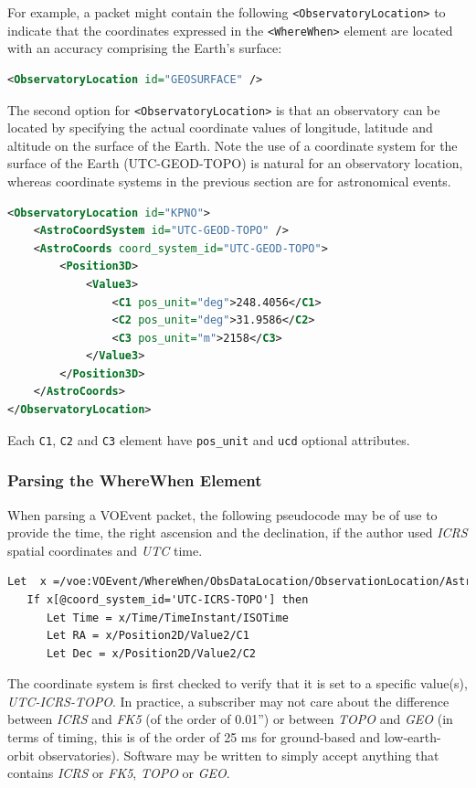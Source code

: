 \documentclass[11pt,a4paper]{ivoa}
\begin{document}
For example, a packet might contain the following {\tt <ObservatoryLocation>} 
to indicate that the coordinates expressed in the {\tt <WhereWhen>} element are 
located with an accuracy comprising the Earth's surface: 
\begin{lstlisting}[language=XML]
<ObservatoryLocation id="GEOSURFACE" /> 
\end{lstlisting}

The second option for {\tt <ObservatoryLocation>} is that an observatory can be 
located by specifying the actual coordinate values of longitude, latitude and 
altitude on the surface of the Earth. Note the use of a coordinate system for 
the surface of the Earth (UTC-GEOD-TOPO) is natural for an observatory location, 
whereas coordinate systems in the previous section are for astronomical events. 
\begin{lstlisting}[language=XML]
<ObservatoryLocation id="KPNO">
    <AstroCoordSystem id="UTC-GEOD-TOPO" />
    <AstroCoords coord_system_id="UTC-GEOD-TOPO">
        <Position3D>
            <Value3>
                <C1 pos_unit="deg">248.4056</C1>
                <C2 pos_unit="deg">31.9586</C2>
                <C3 pos_unit="m">2158</C3>
            </Value3>
        </Position3D>
    </AstroCoords>
</ObservatoryLocation> 
\end{lstlisting}

Each {\tt C1}, {\tt C2} and {\tt C3} element have {\tt pos\_unit} and {\tt ucd}
optional attributes. 

\subsubsection{Parsing the WhereWhen Element}
\label{sec:3.4.3}
When parsing a VOEvent packet, the following pseudocode may be of use to provide
the time, the right ascension and the declination, if the author used 
\emph{ICRS} spatial coordinates and \emph{UTC} time. 
\begin{lstlisting}[language=XML]
Let  x =/voe:VOEvent/WhereWhen/ObsDataLocation/ObservationLocation/AstroCoords
   If x[@coord_system_id='UTC-ICRS-TOPO'] then
      Let Time = x/Time/TimeInstant/ISOTime
      Let RA = x/Position2D/Value2/C1
      Let Dec = x/Position2D/Value2/C2 
\end{lstlisting}

The coordinate system is first checked to verify that it is set to a specific 
value(s), \emph{UTC-ICRS-TOPO}. In practice, a subscriber may not care about the
difference between \emph{ICRS} and \emph{FK5} (of the order of 0.01'') or 
between \emph{TOPO} and \emph{GEO} (in terms of timing, this is of the order of
25 ms for ground-based and low-earth-orbit observatories). Software may be 
written to simply accept anything that contains \emph{ICRS} or \emph{FK5},
\emph{TOPO} or \emph{GEO}. 
\end{document}
